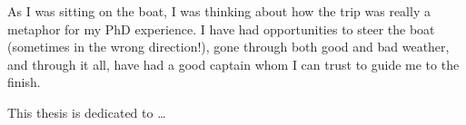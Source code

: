 \begin{frontmatter}

\maketitle

\begin{abstract}

Abstract goes here.

\vspace{1cm}

\noindent Primary Reader: Ernst Niebur\\
Secondary Reader: R{\"u}diger von der Heydt

\end{abstract}

\begin{acknowledgment}

As I was sitting on the boat, I was thinking about how the trip was really a metaphor for my PhD experience. I have had opportunities to steer the boat (sometimes in the wrong direction!), gone through both good and bad weather, and through it all, have had a good captain whom I can trust to guide me to the finish.

\end{acknowledgment}

\begin{dedication}
 
This thesis is dedicated to \ldots

\end{dedication}

\tableofcontents

\listoftables

\listoffigures

\end{frontmatter}
